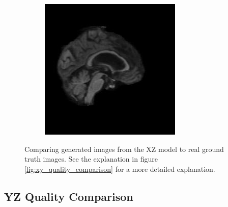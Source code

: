\documentclass[12pt, fleqn, titlepage]{article}
\newcommand\skipperer{0.45pt}
\newcommand{\1}[1]{\mathds{1}\left[#1\right]}
\begin{document}
\begin{figure}[H]
\begin{subfigure}[b]{0.7\textwidth}
		\hskip\skipperer
		\includegraphics[width=0.22\linewidth]{imgs/082_S_0469/XZ_model_082_S_0469_yz_3}
	\end{subfigure}
	\caption{Comparing generated images from the XZ model to real ground truth images. See the explanation in figure \ref{fig:xy_quality_comparison} for a more detailed explanation.}
	\label{fig:xz_quality_comparison}
\end{figure}

\subsection{YZ Quality Comparison}\label{yz_generated}
\end{document}
